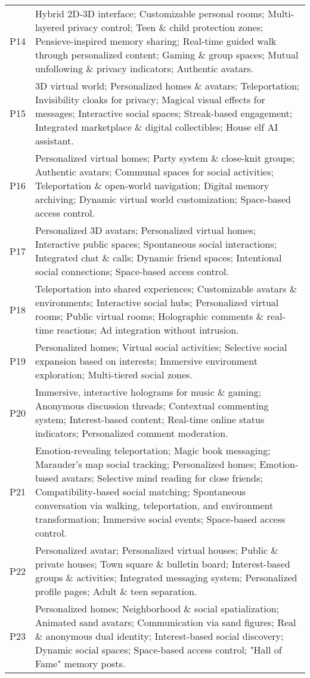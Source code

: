 \begin{spacing}{1.0}
\begin{longtable}{lp{13cm}}
    P14 & Hybrid 2D-3D interface; Customizable personal rooms; Multi-layered privacy control; Teen \& child protection zones; Pensieve-inspired memory sharing; Real-time guided walk through personalized content; Gaming \& group spaces; Mutual unfollowing \& privacy indicators; Authentic avatars. \\
    P15 & 3D virtual world; Personalized homes \& avatars; Teleportation; Invisibility cloaks for privacy; Magical visual effects for messages; Interactive social spaces; Streak-based engagement; Integrated marketplace \& digital collectibles; House elf AI assistant. \\
    P16 & Personalized virtual homes; Party system \& close-knit groups; Authentic avatars; Communal spaces for social activities; Teleportation \& open-world navigation; Digital memory archiving; Dynamic virtual world customization; Space-based access control. \\
    P17 & Personalized 3D avatars; Personalized virtual homes; Interactive public spaces; Spontaneous social interactions; Integrated chat \& calls; Dynamic friend spaces; Intentional social connections; Space-based access control. \\
    P18 & Teleportation into shared experiences; Customizable avatars \& environments; Interactive social hubs; Personalized virtual rooms; Public virtual rooms; Holographic comments \& real-time reactions; Ad integration without intrusion. \\
    P19 & Personalized homes; Virtual social activities; Selective social expansion based on interests; Immersive environment exploration; Multi-tiered social zones. \\
    P20 & Immersive, interactive holograms for music \& gaming; Anonymous discussion threads; Contextual commenting system; Interest-based content; Real-time online status indicators; Personalized comment moderation. \\
    P21 & Emotion-revealing teleportation; Magic book messaging; Marauder's map social tracking; Personalized homes; Emotion-based avatars; Selective mind reading for close friends; Compatibility-based social matching; Spontaneous conversation via walking, teleportation, and environment transformation; Immersive social events; Space-based access control. \\
    P22 & Personalized avatar; Personalized virtual houses; Public \& private houses; Town square \& bulletin board; Interest-based groups \& activities; Integrated messaging system; Personalized profile pages; Adult \& teen separation. \\
    P23 & Personalized homes; Neighborhood \& social spatialization; Animated sand avatars; Communication via sand figures; Real \& anonymous dual identity; Interest-based social discovery; Dynamic social spaces; Space-based access control; "Hall of Fame" memory posts. \\
\end{longtable}
\end{spacing}
\endgroup
\label{tab:participant-summary}
